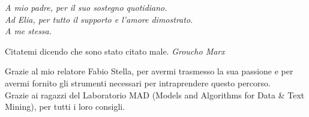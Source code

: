 \documentclass[11pt]{toptesi}
\begin{document}
	





\frontmatter

\begin{flushright}
\noindent
\textit{A mio padre, per il suo sostegno quotidiano.}\\
\textit{Ad Elia, per tutto il supporto e l'amore dimostrato.} \\
\textit{A me stessa.}
\end{flushright}
\cleardoublepage


\begin{flushright}
\noindent
Citatemi dicendo che sono stato citato male.
\textit{Groucho Marx}
\end{flushright}

\cleardoublepage


\ringraziamenti
Grazie al mio relatore Fabio Stella, per avermi trasmesso la sua passione e per avermi fornito gli strumenti necessari per intraprendere questo percorso.\\ 
Grazie ai ragazzi del Laboratorio MAD (Models and Algorithms for Data \& Text Mining), per tutti i loro consigli.


\sommario
\end{document}
